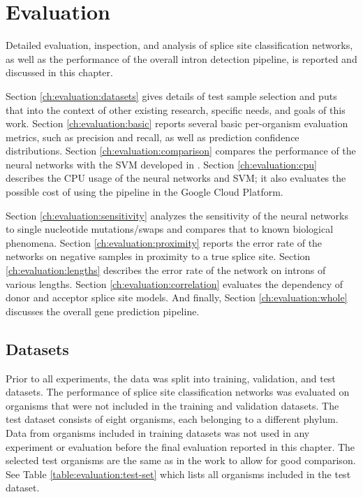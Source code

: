 \chapter{\label{ch:evaluation}Evaluation}

\minitoc

Detailed evaluation, inspection, and analysis of splice site classification
networks, as well as the performance of the overall intron detection pipeline,
is reported and discussed in this chapter.

Section \ref{ch:evaluation:datasets} gives details of test sample selection and
puts that into the context of other existing research, specific needs, and
goals of this work. Section \ref{ch:evaluation:basic} reports several basic
per-organism evaluation metrics, such as precision and recall, as well as
prediction confidence distributions. Section \ref{ch:evaluation:comparison}
compares the performance of the neural networks with the SVM developed in
\cite{barucic}. Section \ref{ch:evaluation:cpu} describes the CPU usage of the
neural networks and SVM; it also evaluates the possible cost of using the
pipeline in the Google Cloud Platform.

Section \ref{ch:evaluation:sensitivity} analyzes the sensitivity of the neural
networks to single nucleotide mutations/swaps and compares that to known
biological phenomena. Section \ref{ch:evaluation:proximity} reports the error
rate of the networks on negative samples in proximity to a true splice site.
Section \ref{ch:evaluation:lengths} describes the error rate of the network on
introns of various lengths. Section \ref{ch:evaluation:correlation} evaluates
the dependency of donor and acceptor splice site models. And finally, Section
\ref{ch:evaluation:whole} discusses the overall gene prediction pipeline.

\section{\label{ch:evaluation:datasets}Datasets}

Prior to all experiments, the data was split into training, validation, and
test datasets. The performance of splice site classification networks was
evaluated on organisms that were not included in the training and validation
datasets. The test dataset consists of eight organisms, each belonging to a
different phylum. Data from organisms included in training datasets was not
used in any experiment or evaluation before the final evaluation reported in
this chapter. The selected test organisms are the same as in the work
\cite{barucic} to allow for good comparison. See Table
\ref{table:evaluation:test-set} which lists all organisms included in the test
dataset.

